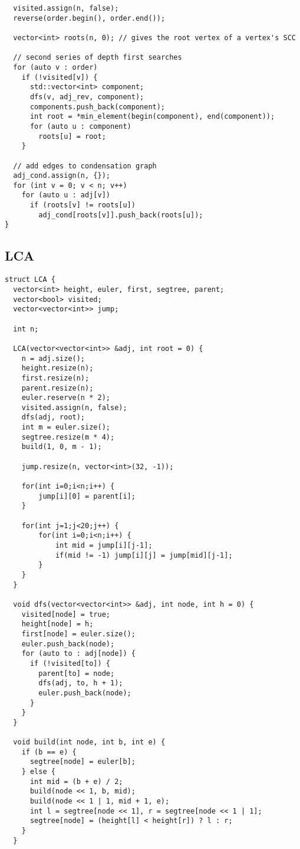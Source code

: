 \documentclass[10pt, a4paper]{article}
\begin{document}
\begin{multicols}{2}
\begin{lstlisting}
  visited.assign(n, false);
  reverse(order.begin(), order.end());

  vector<int> roots(n, 0); // gives the root vertex of a vertex's SCC

  // second series of depth first searches
  for (auto v : order)
    if (!visited[v]) {
      std::vector<int> component;
      dfs(v, adj_rev, component);
      components.push_back(component);
      int root = *min_element(begin(component), end(component));
      for (auto u : component)
        roots[u] = root;
    }

  // add edges to condensation graph
  adj_cond.assign(n, {});
  for (int v = 0; v < n; v++)
    for (auto u : adj[v])
      if (roots[v] != roots[u])
        adj_cond[roots[v]].push_back(roots[u]);
}
\end{lstlisting}
\subsection{LCA}
\begin{lstlisting}
struct LCA {
  vector<int> height, euler, first, segtree, parent;
  vector<bool> visited;
  vector<vector<int>> jump;

  int n;

  LCA(vector<vector<int>> &adj, int root = 0) {
    n = adj.size();
    height.resize(n);
    first.resize(n);
    parent.resize(n);
    euler.reserve(n * 2);
    visited.assign(n, false);
    dfs(adj, root);
    int m = euler.size();
    segtree.resize(m * 4);
    build(1, 0, m - 1);

    jump.resize(n, vector<int>(32, -1));

    for(int i=0;i<n;i++) {
        jump[i][0] = parent[i];
    }

    for(int j=1;j<20;j++) {
        for(int i=0;i<n;i++) {
            int mid = jump[i][j-1];
            if(mid != -1) jump[i][j] = jump[mid][j-1];
        }
    }
  }

  void dfs(vector<vector<int>> &adj, int node, int h = 0) {
    visited[node] = true;
    height[node] = h;
    first[node] = euler.size();
    euler.push_back(node);
    for (auto to : adj[node]) {
      if (!visited[to]) {
        parent[to] = node;
        dfs(adj, to, h + 1);
        euler.push_back(node);
      }
    }
  }

  void build(int node, int b, int e) {
    if (b == e) {
      segtree[node] = euler[b];
    } else {
      int mid = (b + e) / 2;
      build(node << 1, b, mid);
      build(node << 1 | 1, mid + 1, e);
      int l = segtree[node << 1], r = segtree[node << 1 | 1];
      segtree[node] = (height[l] < height[r]) ? l : r;
    }
  }


\end{lstlisting}
\end{multicols}
\end{document}
